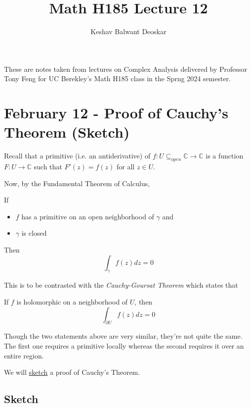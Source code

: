 \documentclass{article}
\title{Math H185 Lecture 12}
\author{Keshav Balwant Deoskar}
\newcommand{\C}{\mathbb{C}}
\begin{document}
\maketitle

These are notes taken from lectures on Complex Analysis delivered by Professor Tony Feng for UC Berekley's Math H185 class in the Sprng 2024 semester.

\tableofcontents

\pagebreak

\section{February 12 - Proof of Cauchy's Theorem (Sketch)}

\vskip 0.5cm
Recall that a primitive (i.e. an antiderivative) of $f : U \subseteq_{open} \C \rightarrow \C$ is a function $F: U \rightarrow \C$ such that $F'(z) = f(z)$ for all $z \in U$.

\vskip 0.5cm
Now, by the Fundamental Theorem of Calculus, 
\begin{dottedbox}
If 
\begin{itemize}
  \item $f$ has a primitive on an open neighborhood of $\gamma$ and
  \item $\gamma$ is closed 
\end{itemize}
Then 
\[ \int_{\gamma} f(z)dz = 0 \]
\end{dottedbox}

\vskip 0.5cm
This is to be contrasted with the \emph{Cauchy-Goursat Theorem} which states that 
\begin{dottedbox} 
If $f$ is holomorphic on a neighborhood of $U$, then 
\[ \int_{\partial U} f(z) dz = 0 \]
\end{dottedbox}


\vskip 0.5cm
Though the two statements above are very similar, they're not quite the same. The first one requires a primitive locally whereas the second requires it over an entire region.


\vskip 0.5cm
We will \underline{sketch} a proof of Cauchy's Theorem.


\vskip 1cm
\subsection{Sketch}
\end{document}
